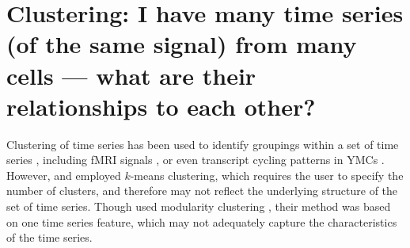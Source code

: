 


\section[Clustering]{Clustering: I have many time series (of the same signal) from many cells --- what are their relationships to each other?}
\label{sec:analysis-clustering}


Clustering of time series has been used to identify groupings within a set of time series \parencite{wangStructureBasedStatisticalFeatures2007}, including fMRI signals \parencite{shafieiDopamineSignalingModulates2019}, or even transcript cycling patterns in YMCs \parencite{tuLogicYeastMetabolic2005}.
However, \textcite{wangStructureBasedStatisticalFeatures2007} and \textcite{tuLogicYeastMetabolic2005} employed $k$-means clustering, which requires the user to specify the number of clusters, and therefore may not reflect the underlying structure of the set of time series.
Though \textcite{shafieiDopamineSignalingModulates2019} used modularity clustering \parencite{newmanModularityCommunityStructure2006}, their method was based on one time series feature, which may not adequately capture the characteristics of the time series.

